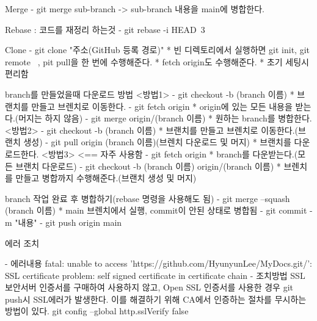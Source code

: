 Merge
  - git merge sub-branch
    -> sub-branch 내용을 main에 병합한다.

Rebase : 코드를 재정리 하는것
  - git rebase -i HEAD~3

Clone
  - git clone "주소(GitHub 등록 경로)"
    * 빈 디렉토리에서 실행하면 git init, git remote ~, pit pull을 한 번에 수행해준다.
    * fetch origin도 수행해준다.
    * 초기 세팅시 편리함

branch를 만들었을때 다운로드 방법
  <방법1>
  - git checkout -b (branch 이름)
    * 브랜치를 만들고 브렌치로 이동한다.
  - git fetch origin
    * origin에 있는 모든 내용을 받는다.(머지는 하지 않음)
  - git merge origin/(branch 이름)
    * 원하는 branch를 병합한다.
  <방법2>
  - git checkout -b (branch 이름)
    * 브랜치를 만들고 브렌치로 이동한다.(브랜치 생성)
  - git pull origin (branch 이름)(브렌치 다운로드 및 머지)
    * 브랜치를 다운로드한다.
  <방법3> <== 자주 사용함
  - git fetch origin
    * branch를 다운받는다.(모든 브랜치 다운로드)
  - git checkout -b (branch 이름) origin/(branch 이름)
    * 브렌치를 만들고 병합까지 수행해준다.(브랜치 생성 및 머지)

branch 작업 완료 후 병합하기(rebase 명령을 사용해도 됨)
  - git merge --squash (branch 이름)
    * main 브렌치에서 실행, commit이 안된 상태로 병합됨
  - git commit -m "내용"
  - git push origin main

에러 조치

- 에러내용 
   fatal: unable to access 'https://github.com/HyunyunLee/MyDocs.git/': SSL certificate problem: self signed certificate in certificate chain
- 조치방법
   SSL 보안서버 인증서를 구매하여 사용하지 않고, Open SSL 인증서를 사용한 경우 git push시 SSL에러가 발생한다.
   이를 해결하기 위해 CA에서 인증하는 절차를 무시하는 방법이 있다.
   git config --global http.sslVerify false
